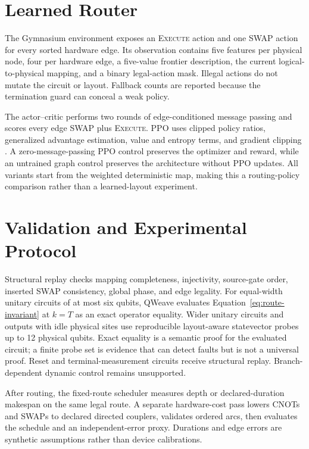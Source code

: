 \documentclass[conference]{IEEEtran}
\begin{document}
\endgroup
\section{Learned Router}
The Gymnasium environment exposes an \textsc{Execute} action and one SWAP
action for every sorted hardware edge. Its observation contains five features
per physical node, four per hardware edge, a five-value frontier description,
the current logical-to-physical mapping, and a binary legal-action mask.
Illegal actions do not mutate the circuit or layout. Fallback counts are
reported because the termination guard can conceal a weak policy.

The actor--critic performs two rounds of edge-conditioned message passing and
scores every edge SWAP plus \textsc{Execute}. PPO uses clipped policy ratios,
generalized advantage estimation, value and entropy terms, and gradient
clipping \cite{schulman2017ppo,schulman2015gae}. A zero-message-passing PPO
control preserves the optimizer and reward, while an untrained graph control
preserves the architecture without PPO updates. All variants start from the
weighted deterministic map, making this a routing-policy comparison rather
than a learned-layout experiment.

\section{Validation and Experimental Protocol}
Structural replay checks mapping completeness, injectivity, source-gate order,
inserted SWAP consistency, global phase, and edge legality. For equal-width
unitary circuits of at most six qubits, QWeave evaluates
Equation~\eqref{eq:route-invariant} at $k=T$ as an exact operator equality.
Wider unitary circuits and outputs with idle physical sites use reproducible
layout-aware statevector probes up to 12 physical qubits. Exact equality is a
semantic proof for the evaluated circuit; a finite probe set is evidence that
can detect faults but is not a universal proof. Reset and terminal-measurement
circuits receive structural replay. Branch-dependent dynamic control remains
unsupported.

After routing, the fixed-route scheduler measures depth or declared-duration
makespan on the same legal route. A separate hardware-cost pass lowers CNOTs
and SWAPs to declared directed couplers, validates ordered arcs, then evaluates
the schedule and an independent-error proxy. Durations and edge errors are
synthetic assumptions rather than device calibrations.
\end{document}
